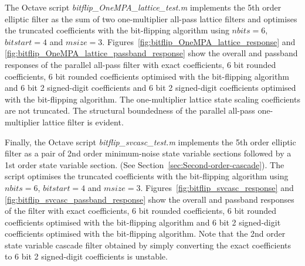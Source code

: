 \documentclass[a4paper,twoside,10pt,english]{report}
\begin{document}
The Octave script \emph{bitflip\_OneMPA\_lattice\_test.m}
implements the 5th order elliptic filter as the sum of two one-multiplier
all-pass lattice filters and optimises the truncated coefficients with the 
bit-flipping algorithm using $nbits=6$, $bitstart=4$ and $msize=3$.
Figures~\ref{fig:bitflip_OneMPA_lattice_response} and 
\ref{fig:bitflip_OneMPA_lattice_passband_response} show the overall and passband
responses of the parallel all-pass filter with exact coefficients, 6 bit rounded
coefficients, 6 bit rounded coefficients optimised with the bit-flipping 
algorithm and 6 bit 2 signed-digit coefficients and 6 bit 2 signed-digit 
coefficients optimised with the bit-flipping algorithm. The one-multiplier 
lattice state scaling coefficients are not truncated. The structural boundedness
of the parallel all-pass one-multiplier lattice filter is evident.

Finally, the Octave script \emph{bitflip\_svcasc\_test.m} implements the 5th
order elliptic filter as a pair of 2nd order minimum-noise state variable 
sections followed by a 1st order state variable section. (See 
Section~\ref{sec:Second-order-cascade}). The script optimises the truncated 
coefficients with the bit-flipping algorithm using $nbits=6$, $bitstart=4$ and
$msize=3$. Figures~\ref{fig:bitflip_svcasc_response} and 
\ref{fig:bitflip_svcasc_passband_response} show the overall and passband
responses of the filter with exact coefficients, 6 bit rounded
coefficients, 6 bit rounded coefficients optimised with the bit-flipping 
algorithm and 6 bit 2 signed-digit coefficients optimised with the bit-flipping 
algorithm. Note that the 2nd order state variable cascade filter obtained by 
simply converting the exact coefficients to 6 bit 2 signed-digit coefficients 
is unstable.
\end{document}
